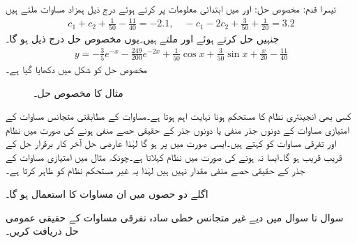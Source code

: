 تیسرا قدم: مخصوص حل:\quad {} اور  میں ابتدائی معلومات پر کرتے ہوئے درج ذیل ہمزاد مساوات ملتے ہیں
\begin{align*}
c_1+c_2+\frac{1}{50}-\frac{11}{40}=-2.1,\quad -c_1-2c_2+\frac{3}{50}+\frac{1}{20}=3.2
\end{align*}
جنہیں حل کرتے ہوئے  اور  ملتے ہیں۔یوں مخصوص حل درج ذیل ہو گا۔
\begin{align*}
y=-\frac{3}{5}e^{-x}-\frac{249}{200}e^{-2x}+\tfrac{1}{50}\cos x+\tfrac{3}{50}\sin x+\tfrac{x}{20}-\frac{11}{40}
\end{align*}
مخصوص حل کو شکل  میں دکھایا گیا ہے۔
\begin{figure}
\centering
{}
\caption{مثال  کا مخصوص حل۔}
\label{شکل_مثال_سادہ_دو_نا_معلوم_سر_پ}
\end{figure}

کسی بھی انجینئری نظام کا مستحکم ہونا نہایت اہم ہوتا ہے۔مساوات   کے مطابقتی متجانس مساوات کے امتیازی مساوات کے دونوں جذر منفی یا دونوں جذر کے حقیقی حصے منفی ہونے کی صورت میں نظام اور تفرقی مساوات کو  کہتے ہیں۔ایسی صورت میں  پر  ہو گا لہٰذا عارضی حل  آخر کار برقرار حل  کے قریب  قریب ہو گا۔ایسا نہ ہونے کی صورت میں نظام  کہلاتا ہے۔چونکہ مثال  میں امتیازی مساوات کے جذر کے حقیقی حصے منفی مقدار نہیں ہیں لہٰذا یہ غیر مستحکم نظام کو ظاہر کرتا ہے۔

اگلے دو حصوں میں ان مساوات کا استعمال ہو گا۔



سوال  تا سوال  میں دیے غیر متجانس خطی سادہ تفرقی مساوات کے حقیقی عمومی حل دریافت کریں۔


